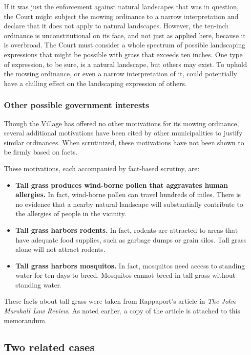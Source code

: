 \documentclass[12pt]{article}
\begin{document}
If it was just the enforcement against natural landscapes that was in question, the Court might subject the mowing ordinance to a narrow interpretation and declare that it does not apply to natural landscapes.
However, the ten-inch ordinance is unconstitutional on its face, and not just as applied here, because it is overbroad.
The Court must consider a whole spectrum of possible landscaping expressions that might be possible with grass that exceeds ten inches.
One type of expression, to be sure, is a natural landscape, but others may exist.
To uphold the mowing ordinance, or even a narrow interpretation of it, could potentially have a chilling effect on the landscaping expression of others.


\subsubsection{Other possible government interests}
\label{section:other_interests}
Though the Village has offered no other motivations for its mowing ordinance, several additional motivations have been cited by other municipalities to justify similar ordinances.
When scrutinized, these motivations have not been shown to be firmly based on facts.

These motivations, each accompanied by fact-based scrutiny, are:
\begin{itemize}
\item {\bf Tall grass produces wind-borne pollen that aggravates human allergies.}  In fact, wind-borne pollen can travel hundreds of miles.  
There is no evidence that a nearby natural landscape will substantially contribute to the allergies of people in the vicinity.
\item {\bf Tall grass harbors rodents.}  In fact, rodents are attracted to areas that have adequate food supplies, such as garbage dumps or grain silos.
Tall grass alone will not attract rodents.
\item {\bf Tall grass harbors mosquitos.}  In fact, mosquitos need access to standing water for ten days to breed.
Mosquitos cannot breed in tall grass without standing water.
\end{itemize}
These facts about tall grass were taken from Rappaport's article in {\em The John Marshall Law Review}.
As noted earlier, a copy of the article is attached to this memorandum.

\subsection{Two related cases}
\end{document}
